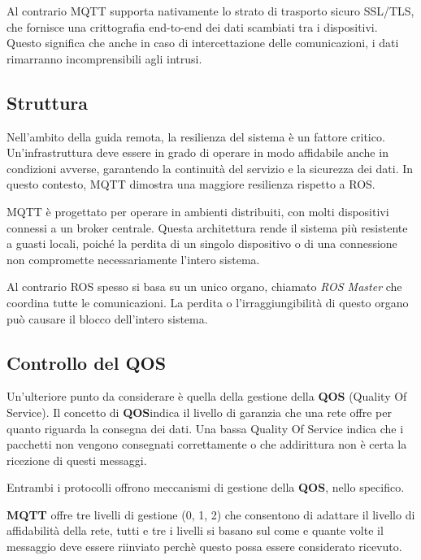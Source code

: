 \noindent Al contrario MQTT supporta nativamente lo strato di trasporto sicuro SSL/TLS, che fornisce una crittografia end-to-end dei dati scambiati tra i dispositivi. Questo significa che anche in caso di intercettazione delle comunicazioni, i dati rimarranno incomprensibili agli intrusi.

\subsection{Struttura}
Nell'ambito della guida remota, la resilienza del sistema è un fattore critico. Un'infrastruttura deve essere in grado di operare in modo affidabile anche in condizioni avverse, garantendo la continuità del servizio e la sicurezza dei dati. In questo contesto, MQTT dimostra una maggiore resilienza rispetto a ROS. 

\noindent MQTT è progettato per operare in ambienti distribuiti, con molti dispositivi connessi a un broker centrale. Questa architettura rende il sistema più resistente a guasti locali, poiché la perdita di un singolo dispositivo o di una connessione non compromette necessariamente l'intero sistema.

\noindent Al contrario ROS spesso si basa su un unico organo, chiamato \textit{ROS Master} che coordina tutte le comunicazioni. La perdita o l'irraggiungibilità di questo organo può causare il blocco dell'intero sistema.

\subsection{Controllo del QOS}
Un'ulteriore punto da considerare è quella della gestione della \textbf{QOS} (Quality Of Service). Il concetto di \textbf{QOS}indica il livello di garanzia che una rete offre per quanto riguarda la consegna dei dati. Una bassa Quality Of Service indica che i pacchetti non vengono consegnati correttamente o che addirittura non è certa la ricezione di questi messaggi.  

\noindent Entrambi i protocolli offrono meccanismi di gestione della \textbf{QOS}, nello specifico.

\noindent \textbf{MQTT} offre tre livelli di gestione (0, 1, 2) che consentono di adattare il livello di affidabilità della rete, tutti e tre i livelli si basano sul come e quante volte il messaggio deve essere riinviato perchè questo possa essere considerato ricevuto. 

